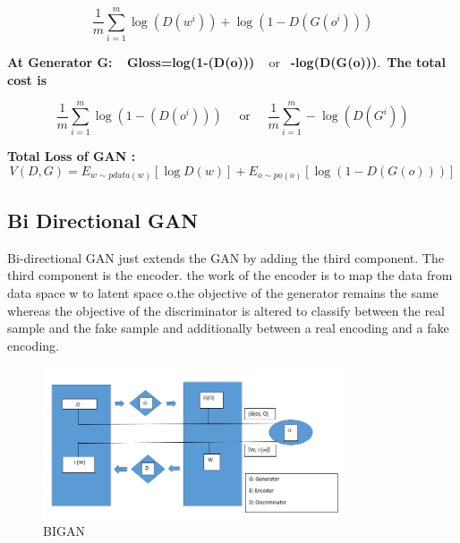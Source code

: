 \documentclass[runningheads]{llncs}
\begin{document}
{\begin{equation}
\frac{1}{m} \sum_{i=1}^{m} \log \left(D\left(w^{i}\right)\right)+\log \left(1-D\left(G\left(o^{i}\right)\right)\right)
\end{equation}

\newline
\newline
\hfill \break
\textbf{At Generator G:} ~ \textbf{Gloss=log(1-(D(o)))} ~ or ~\textbf{-log(D(G(o)))}.~\textbf{The total cost is} 
\newline
\hfill

\begin{equation}
\frac{1}{m} \sum_{i=1}^{m} \log \left(1-\left(D\left(o^{i}\right)\right)\right) \quad \text { or } \quad \frac{1}{m} \sum_{i=1}^{m}-\log \left(D\left(G^{i}\right)\right)
\end{equation}

\hfill \break
\newline
\textbf{Total Loss of GAN :} 
\begin{equation}
V(D, G)=E_{w \sim p d a t a(w)}[\log D(w)]+E_{o \sim p o(o)}[\log (1-D(G(o)))]
\end{equation}

\hfill \break
\subsection{ Bi Directional GAN}
Bi-directional GAN just extends the GAN by adding the third component. The third component is the encoder. the work of the encoder is to map the data from data space w to latent space o.the objective of the generator remains the same whereas the objective of the discriminator is altered to classify between the real sample and the fake sample and additionally between a real encoding and a fake encoding.
\\
\begin{figure}[h]
\centering

\includegraphics[width=3.5in]{bigan.png}

\caption{BIGAN}
\label{LP}
\end{figure}
\newline

}
\end{document}
